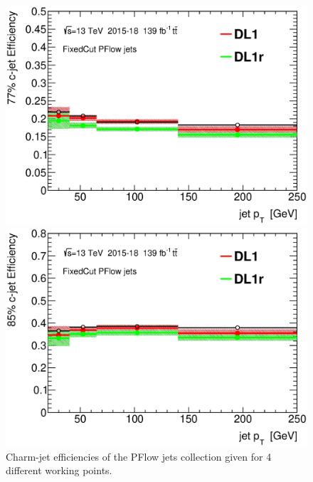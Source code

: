 \documentclass[letterpaper,12pt]{article}
\begin{document}
\begin{figure}[H]
\begin{minipage}[b]{.45\textwidth}
\includegraphics[width=1\textwidth]{SFplots_december/DL1allPFlowDec_DL1rallPFlowDec/eff77.eps}
\end{minipage}\hfill
\begin{minipage}[b]{.45\textwidth}
\centering
\includegraphics[width=1\textwidth]{SFplots_december/DL1allPFlowDec_DL1rallPFlowDec/eff85.eps}
\end{minipage}
\caption{Charm-jet efficiencies of the PFlow jets collection 
given for 4 different working points.} \label{fig:Dec_eff_PFlow}
\end{figure}
\end{document}
